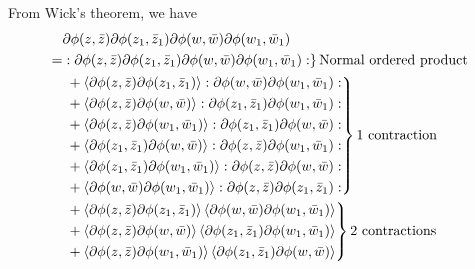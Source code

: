 \documentclass[10pt]{article}
\begin{document}
From Wick's theorem, we have
\begin{equation}\label{eq:app:OPE:boson:TT:wick_1}
    \begin{aligned}
          & \partial\phi(z,\bar{z})\partial\phi(z_1,\bar{z}_1)\partial\phi(w,\bar{w})\partial\phi(w_1,\bar{w}_1)                                                                 \\
        = & \left.:\partial\phi(z,\bar{z})\partial\phi(z_1,\bar{z}_1)\partial\phi(w,\bar{w})\partial\phi(w_1,\bar{w}_1):\right\rbrace\text{Normal ordered product}       \\
          & \left.\begin{aligned}
                       & +\expval{\partial\phi(z,\bar{z})\partial\phi(z_1,\bar{z}_1)}:\partial\phi(w,\bar{w})\partial\phi(w_1,\bar{w}_1): \\
                       & +\expval{\partial\phi(z,\bar{z})\partial\phi(w,\bar{w})}:\partial\phi(z_1,\bar{z}_1)\partial\phi(w_1,\bar{w}_1): \\
                       & +\expval{\partial\phi(z,\bar{z})\partial\phi(w_1,\bar{w}_1)}:\partial\phi(z_1,\bar{z}_1)\partial\phi(w,\bar{w}): \\
                       & +\expval{\partial\phi(z_1,\bar{z}_1)\partial\phi(w,\bar{w})}:\partial\phi(z,\bar{z})\partial\phi(w_1,\bar{w}_1): \\
                       & +\expval{\partial\phi(z_1,\bar{z}_1)\partial\phi(w_1,\bar{w}_1)}:\partial\phi(z,\bar{z})\partial\phi(w,\bar{w}): \\
                       & +\expval{\partial\phi(w,\bar{w})\partial\phi(w_1,\bar{w}_1)}:\partial\phi(z,\bar{z})\partial\phi(z_1,\bar{z}_1):
                  \end{aligned}\right\rbrace\text{1 contraction}                  \\
          & \left.\begin{aligned}
                       & +\expval{\partial\phi(z,\bar{z})\partial\phi(z_1,\bar{z}_1)}\expval{\partial\phi(w,\bar{w})\partial\phi(w_1,\bar{w}_1)} \\
                       & +\expval{\partial\phi(z,\bar{z})\partial\phi(w,\bar{w})}\expval{\partial\phi(z_1,\bar{z}_1)\partial\phi(w_1,\bar{w}_1)} \\
                       & +\expval{\partial\phi(z,\bar{z})\partial\phi(w_1,\bar{w}_1)}\expval{\partial\phi(z_1,\bar{z}_1)\partial\phi(w,\bar{w})}
                  \end{aligned}\right\rbrace\text{2 contractions}
    \end{aligned}
\end{equation}
\end{document}
